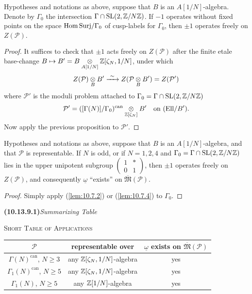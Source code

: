 \begin{kcor}\label{cor:10.13.8}
Hypotheses and notations as above, suppose that $B$ is an $A[1/N]$-algebra. Denote by $\Gamma_0$ the intersection $\Gamma \cap \operatorname{SL}(2, \mathbb{Z}/N\mathbb{Z})$. If $-1$ operates without fixed points on the space $\mathrm{Hom\,Surj}/\Gamma_0$ of cusp-labels for $\Gamma_0$, then $\pm 1$ operates freely on $Z(\mathcal{P})$.
\end{kcor}

\begin{proof}
It suffices to check that $\pm 1$ acts freely on $Z(\mathcal{P})$ after the finite etale base-change $B \mapsto B' = B \underset{A[1/N]}{\otimes} \mathbb{Z}[\zeta_N, 1/N]$, under which
\[
Z(\mathcal{P}) \underset{B}{\otimes} B' \xrightarrow{\ \sim\ } Z(\mathcal{P} \underset{B}{\otimes} B') = Z(\mathcal{P}')
\]
where $\mathcal{P}'$ is the moduli problem attached to $\Gamma_0 = \Gamma \cap \operatorname{SL}(2, \mathbb{Z}/N\mathbb{Z})$
\[
\mathcal{P}' = ([\Gamma(N)]/\Gamma_0)^{\mathrm{can}} \underset{\mathbb{Z}[\zeta_N]}{\otimes} B' \quad\text{on } (\mathrm{Ell}/B') .
\]
Now apply the previous proposition to $\mathcal{P}'$.
\end{proof}

\begin{kcor}\label{cor:10.13.9}
Hypotheses and notations as above, suppose that $B$ is an $A[1/N]$-algebra, and that $\mathcal{P}$ is representable. If $N$ is odd, or if $N = 1, 2, 4$ and $\Gamma_0 = \Gamma \cap \operatorname{SL}(2, \mathbb{Z}/N\mathbb{Z})$ lies in the upper unipotent subgroup $\begin{pmatrix} 1 & * \\ 0 & 1 \end{pmatrix}$, then $\pm 1$ operates freely on $Z(\mathcal{P})$, and consequently $\underline{\omega}$ ``exists'' on $\overline{\mathfrak{M}}(\mathcal{P})$.
\end{kcor}

\begin{proof}
Simply apply (\ref{lem:10.7.2}) or (\ref{lem:10.7.4}) to $\Gamma_0$.
\end{proof}

\par\smallskip\noindent
\textbf{(10.13.9.1)}\quad\emph{Summarizing Table}
\begin{center}
\textsc{Short Table of Applications}
\vspace{0.5em}

{\setlength{\tabcolsep}{4.5pt}%
\begin{tabular}{c|c|c}
\hline
$\mathcal{P}$ & representable over & $\underline{\omega}$ exists on $\overline{\mathfrak{M}}(\mathcal{P})$ \\
\hline
$\Gamma(N)^{\mathrm{can}}$, $N \ge 3$ & any $\mathbb{Z}[\zeta_N, 1/N]$-algebra & yes \\
\hline
$\Gamma_1(N)^{\mathrm{can}}$, $N \ge 5$ & any $\mathbb{Z}[\zeta_N, 1/N]$-algebra & yes \\
\hline
$\Gamma_1(N)$, $N \ge 5$ & any $\mathbb{Z}[1/N]$-algebra & yes \\
\hline
\end{tabular}}
\end{center}


